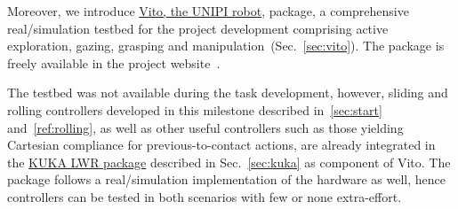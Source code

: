 \documentclass[a4paper,11pt,pdf]{pacmanreport}
\begin{document}






Moreover, we introduce \href{https://github.com/CentroEPiaggio/vito_robot}{Vito, the UNIPI robot}, package, a comprehensive real/simulation testbed for the project development comprising active exploration, gazing, grasping and manipulation~(Sec.~\ref{sec:vito}). The package is freely available in the project website~\cite{PACMAN_software}.

The testbed was not available during the task development, however, sliding and rolling controllers developed in this milestone described in~\ref{sec:start} and~\ref{ref:rolling}, as well as other useful controllers such as those yielding Cartesian compliance for previous-to-contact actions, are already integrated in the \href{https://github.com/CentroEPiaggio/kuka-lwr}{KUKA LWR package} described in Sec.~\ref{sec:kuka} as component of Vito. The package follows a real/simulation implementation of the hardware as well, hence controllers can be tested in both scenarios with few or none extra-effort.
\end{document}
